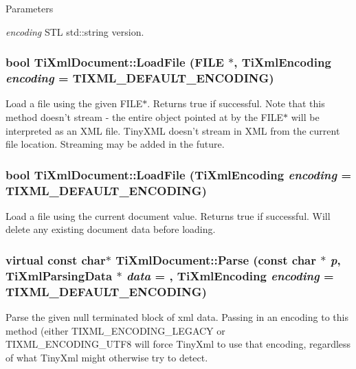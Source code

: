 \begin{DoxyParams}{Parameters}
\item[{\em encoding}]STL std::string version. \end{DoxyParams}
\hypertarget{class_ti_xml_document_a41f6fe7200864d1dca663d230caf8db6}{
\subsubsection[{LoadFile}]{\setlength{\rightskip}{0pt plus 5cm}bool TiXmlDocument::LoadFile (FILE $\ast$, \/  TiXmlEncoding {\em encoding} = {\ttfamily TIXML\_\-DEFAULT\_\-ENCODING})}}
\label{class_ti_xml_document_a41f6fe7200864d1dca663d230caf8db6}
Load a file using the given FILE$\ast$. Returns true if successful. Note that this method doesn't stream -\/ the entire object pointed at by the FILE$\ast$ will be interpreted as an XML file. TinyXML doesn't stream in XML from the current file location. Streaming may be added in the future. \hypertarget{class_ti_xml_document_a4c852a889c02cf251117fd1d9fe1845f}{
\subsubsection[{LoadFile}]{\setlength{\rightskip}{0pt plus 5cm}bool TiXmlDocument::LoadFile (TiXmlEncoding {\em encoding} = {\ttfamily TIXML\_\-DEFAULT\_\-ENCODING})}}
\label{class_ti_xml_document_a4c852a889c02cf251117fd1d9fe1845f}
Load a file using the current document value. Returns true if successful. Will delete any existing document data before loading. \hypertarget{class_ti_xml_document_a17ebabe36926ef398e78dec0d0ad0378}{
\subsubsection[{Parse}]{\setlength{\rightskip}{0pt plus 5cm}virtual const char$\ast$ TiXmlDocument::Parse (const char $\ast$ {\em p}, \/  TiXmlParsingData $\ast$ {\em data} = {}, \/  TiXmlEncoding {\em encoding} = {\ttfamily TIXML\_\-DEFAULT\_\-ENCODING})}}
\label{class_ti_xml_document_a17ebabe36926ef398e78dec0d0ad0378}
Parse the given null terminated block of xml data. Passing in an encoding to this method (either TIXML\_\-ENCODING\_\-LEGACY or TIXML\_\-ENCODING\_\-UTF8 will force TinyXml to use that encoding, regardless of what TinyXml might otherwise try to detect. 

